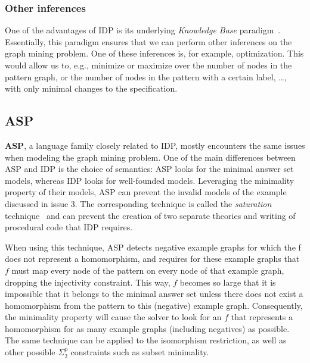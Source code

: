
\subsubsection{Other inferences}
One of the advantages of IDP is its underlying \emph{Knowledge Base} paradigm~\citep{?}.
Essentially, this paradigm ensures that we can perform other inferences on the graph mining problem.
One of these inferences is, for example, optimization.
This would allow us to, e.g., minimize or maximize over the number of nodes in the pattern graph, or the number of nodes in the pattern with a certain label, \ldots, with only minimal changes to the specification.

\reversemarginpar

\subsection{ASP}
\textbf{ASP}, a language family closely related to IDP, mostly encounters the same issues when modeling the graph mining problem.
One of the main differences between ASP and IDP is the choice of semantics: ASP looks for the minimal answer set models, whereas IDP looks for well-founded models.
Leveraging the minimality property of their models, ASP can prevent the invalid models of the example discussed in issue 3.
The corresponding technique is called the \emph{saturation} technique~\citep{Eiter} and can prevent the creation of two separate theories and writing of procedural code that IDP requires.

When using this technique, ASP detects negative example graphs for which the f does not represent a homomorphism, and requires for these example graphs that $f$ must map every node of the pattern on every node of that example graph, dropping the injectivity constraint.
This way, $f$ becomes so large that it is impossible that it belongs to the minimal answer set unless there does not exist a homomorphism from the pattern to this (negative) example graph.
Consequently, the minimality property will cause the solver to look for an $f$ that represents a homomorphism for as many example graphs (including negatives) as possible.
The same technique can be applied to the isomorphism restriction, as well as other possible $\Sigma_{2}^{p}$ constraints such as subset minimality.



